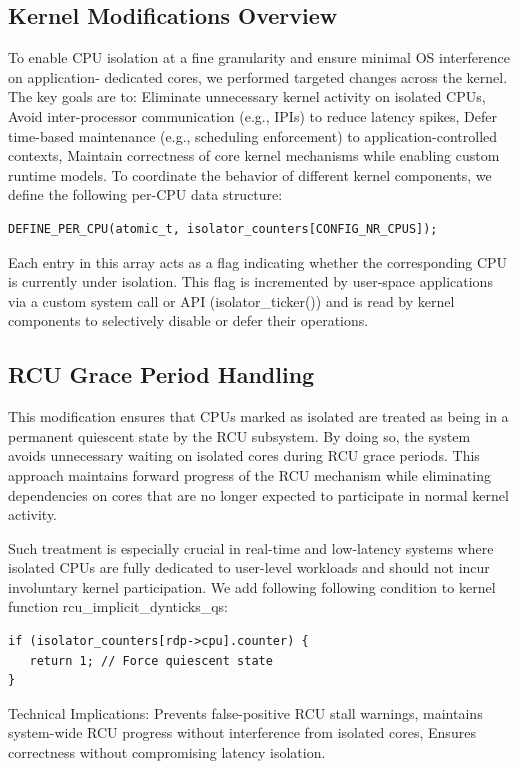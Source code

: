 \documentclass[letterpaper]{article}
\begin{document}
\subsection{Kernel Modifications Overview}
To enable CPU isolation at a fine granularity and ensure minimal OS interference on application-
dedicated cores, we performed targeted changes across the kernel. The key goals are to:
Eliminate unnecessary kernel activity on isolated CPUs,
Avoid inter-processor communication (e.g., IPIs) to reduce latency spikes,
Defer time-based maintenance (e.g., scheduling enforcement) to application-controlled contexts,
Maintain correctness of core kernel mechanisms while enabling custom runtime models.
To coordinate the behavior of different kernel components, we define the following per-CPU data
structure:
\begin{verbatim}
DEFINE_PER_CPU(atomic_t, isolator_counters[CONFIG_NR_CPUS]);
\end{verbatim}
Each entry in this array acts as a flag indicating whether the corresponding CPU is currently under
isolation. This flag is incremented by user-space applications via a custom system call or API
(isolator\_ticker()) and is read by kernel components to selectively disable or defer their operations.


\subsection{RCU Grace Period Handling}
This modification ensures that CPUs marked as isolated are treated as being in a permanent
quiescent state by the RCU subsystem. By doing so, the system avoids unnecessary waiting on
isolated cores during RCU grace periods. This approach maintains forward progress of the RCU
mechanism while eliminating dependencies on cores that are no longer expected to participate in
normal kernel activity.

Such treatment is especially crucial in real-time and low-latency systems where isolated CPUs are
fully dedicated to user-level workloads and should not incur involuntary kernel participation.
We add following following condition to kernel function rcu\_implicit\_dynticks\_qs:
\begin{verbatim}
if (isolator_counters[rdp->cpu].counter) {
   return 1; // Force quiescent state
}
\end{verbatim}
Technical Implications:
Prevents false-positive RCU stall warnings,
maintains system-wide RCU progress without interference from isolated cores,
Ensures correctness without compromising latency isolation.
\end{document}
